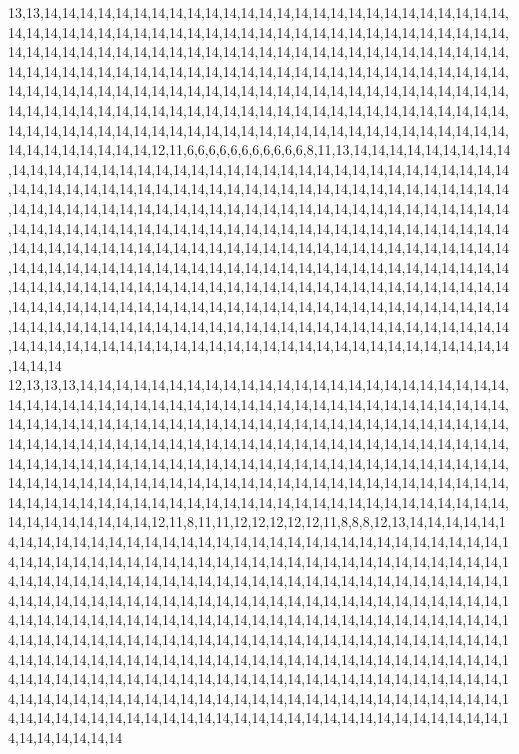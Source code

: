 13,13,14,14,14,14,14,14,14,14,14,14,14,14,14,14,14,14,14,14,14,14,14,14,14,14,14,14,14,14,14,14,14,14,14,14,14,14,14,14,14,14,14,14,14,14,14,14,14,14,14,14,14,14,14,14,14,14,14,14,14,14,14,14,14,14,14,14,14,14,14,14,14,14,14,14,14,14,14,14,14,14,14,14,14,14,14,14,14,14,14,14,14,14,14,14,14,14,14,14,14,14,14,14,14,14,14,14,14,14,14,14,14,14,14,14,14,14,14,14,14,14,14,14,14,14,14,14,14,14,14,14,14,14,14,14,14,14,14,14,14,14,14,14,14,14,14,14,14,14,14,14,14,14,14,14,14,14,14,14,14,14,14,14,14,14,14,14,14,14,14,14,14,14,14,14,14,14,14,14,14,14,14,14,14,14,14,14,14,14,14,14,14,14,14,14,14,14,14,14,14,14,14,14,12,11,6,6,6,6,6,6,6,6,6,6,6,8,11,13,14,14,14,14,14,14,14,14,14,14,14,14,14,14,14,14,14,14,14,14,14,14,14,14,14,14,14,14,14,14,14,14,14,14,14,14,14,14,14,14,14,14,14,14,14,14,14,14,14,14,14,14,14,14,14,14,14,14,14,14,14,14,14,14,14,14,14,14,14,14,14,14,14,14,14,14,14,14,14,14,14,14,14,14,14,14,14,14,14,14,14,14,14,14,14,14,14,14,14,14,14,14,14,14,14,14,14,14,14,14,14,14,14,14,14,14,14,14,14,14,14,14,14,14,14,14,14,14,14,14,14,14,14,14,14,14,14,14,14,14,14,14,14,14,14,14,14,14,14,14,14,14,14,14,14,14,14,14,14,14,14,14,14,14,14,14,14,14,14,14,14,14,14,14,14,14,14,14,14,14,14,14,14,14,14,14,14,14,14,14,14,14,14,14,14,14,14,14,14,14,14,14,14,14,14,14,14,14,14,14,14,14,14,14,14,14,14,14,14,14,14,14,14,14,14,14,14,14,14,14,14,14,14,14,14,14,14,14,14,14,14,14,14,14,14,14,14,14,14,14,14,14,14,14,14,14,14,14,14,14,14,14,14,14,14,14,14,14,14,14,14,14,14,14,14,14,14,14,14,14,14,14,14,14,14,14,14,14,14,14,14,14
12,13,13,13,14,14,14,14,14,14,14,14,14,14,14,14,14,14,14,14,14,14,14,14,14,14,14,14,14,14,14,14,14,14,14,14,14,14,14,14,14,14,14,14,14,14,14,14,14,14,14,14,14,14,14,14,14,14,14,14,14,14,14,14,14,14,14,14,14,14,14,14,14,14,14,14,14,14,14,14,14,14,14,14,14,14,14,14,14,14,14,14,14,14,14,14,14,14,14,14,14,14,14,14,14,14,14,14,14,14,14,14,14,14,14,14,14,14,14,14,14,14,14,14,14,14,14,14,14,14,14,14,14,14,14,14,14,14,14,14,14,14,14,14,14,14,14,14,14,14,14,14,14,14,14,14,14,14,14,14,14,14,14,14,14,14,14,14,14,14,14,14,14,14,14,14,14,14,14,14,14,14,14,14,14,14,14,14,14,14,14,14,14,14,14,14,14,14,14,14,14,14,14,14,12,11,8,11,11,12,12,12,12,12,11,8,8,8,12,13,14,14,14,14,14,14,14,14,14,14,14,14,14,14,14,14,14,14,14,14,14,14,14,14,14,14,14,14,14,14,14,14,14,14,14,14,14,14,14,14,14,14,14,14,14,14,14,14,14,14,14,14,14,14,14,14,14,14,14,14,14,14,14,14,14,14,14,14,14,14,14,14,14,14,14,14,14,14,14,14,14,14,14,14,14,14,14,14,14,14,14,14,14,14,14,14,14,14,14,14,14,14,14,14,14,14,14,14,14,14,14,14,14,14,14,14,14,14,14,14,14,14,14,14,14,14,14,14,14,14,14,14,14,14,14,14,14,14,14,14,14,14,14,14,14,14,14,14,14,14,14,14,14,14,14,14,14,14,14,14,14,14,14,14,14,14,14,14,14,14,14,14,14,14,14,14,14,14,14,14,14,14,14,14,14,14,14,14,14,14,14,14,14,14,14,14,14,14,14,14,14,14,14,14,14,14,14,14,14,14,14,14,14,14,14,14,14,14,14,14,14,14,14,14,14,14,14,14,14,14,14,14,14,14,14,14,14,14,14,14,14,14,14,14,14,14,14,14,14,14,14,14,14,14,14,14,14,14,14,14,14,14,14,14,14,14,14,14,14,14,14,14,14,14,14,14,14,14,14,14,14,14,14,14,14,14,14,14,14,14,14,14
